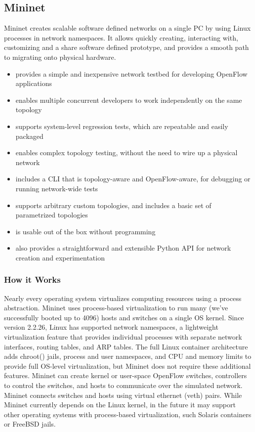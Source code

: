 \documentclass[12pt,a4paper]{article}
\begin{document}
\subsection{Mininet}
Mininet\cite{mininet} creates scalable software defined networks on a single PC by using Linux
processes in network namespaces. It allows quickly creating, interacting with,
customizing and a share software defined prototype, and provides a smooth path to
migrating onto physical hardware.

\begin{itemize}
\item provides a simple and inexpensive network testbed for developing OpenFlow applications
\item enables multiple concurrent developers to work independently on the same topology
\item supports system-level regression tests, which are repeatable and easily packaged
\item enables complex topology testing, without the need to wire up a physical network
\item includes a CLI that is topology-aware and OpenFlow-aware, for debugging or running network-wide tests
\item supports arbitrary custom topologies, and includes a basic set of parametrized topologies
\item is usable out of the box without programming
\item also provides a straightforward and extensible Python API for network creation and experimentation
\end{itemize}

\subsubsection*{How it Works}
Nearly every operating system virtualizes computing resources using a process abstraction. Mininet uses process-based virtualization to run many (we've successfully booted up to 4096) hosts and switches on a single OS kernel. Since version 2.2.26, Linux has supported network namespaces, a lightweight virtualization feature that provides individual processes with separate network interfaces, routing tables, and ARP tables. The full Linux container architecture adds chroot() jails, process and user namespaces, and CPU and memory limits to provide full OS-level virtualization, but Mininet does not require these additional features. Mininet can create kernel or user-space OpenFlow switches, controllers to control the switches, and hosts to communicate over the simulated network. Mininet connects switches and hosts using virtual ethernet (veth) pairs. While Mininet currently depends on the Linux kernel, in the future it may support other operating systems with process-based virtualization, such Solaris containers or FreeBSD jails.
\end{document}
